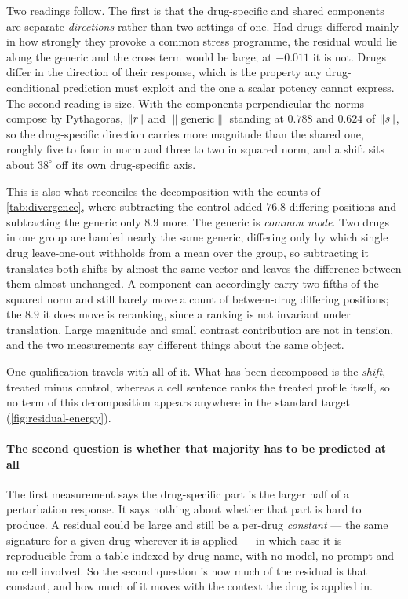Two readings follow. The first is that the drug-specific and shared components are
separate \emph{directions} rather than two settings of one. Had drugs differed
mainly in how strongly they provoke a common stress programme, the residual would
lie along the generic and the cross term would be large; at $-0.011$ it is not.
Drugs differ in the direction of their response, which is the property any
drug-conditional prediction must exploit and the one a scalar potency cannot
express. The second reading is size. With the components perpendicular the norms
compose by Pythagoras, $\lVert r \rVert$ and $\lVert \textrm{generic} \rVert$
standing at $0.788$ and $0.624$ of $\lVert s \rVert$, so the drug-specific direction carries more magnitude than the shared one, roughly five to four in norm and three to two in squared norm, and a
shift sits about $38^{\circ}$ off its own drug-specific axis.

This is also what reconciles the decomposition with the counts of
\cref{tab:divergence}, where subtracting the control added $76.8$ differing
positions and subtracting the generic only $8.9$ more. The generic is
\emph{common mode}. Two drugs in one group are handed nearly the same generic,
differing only by which single drug leave-one-out withholds from a mean over the
group, so subtracting it translates both shifts by almost the same vector and
leaves the difference between them almost unchanged. A component can accordingly
carry two fifths of the squared norm and still barely move a count of between-drug
differing positions; the $8.9$ it does move is reranking, since a ranking is not
invariant under translation. Large magnitude and small contrast contribution are
not in tension, and the two measurements say different things about the same
object.

One qualification travels with all of it. What has been decomposed is the
\emph{shift}, treated minus control, whereas a cell sentence ranks the treated
profile itself, so no term of this decomposition appears anywhere in the standard
target (\cref{fig:residual-energy}).




\paragraph{The second question is whether that majority has to be predicted at all}
The first measurement says the drug-specific part is the larger half of a
perturbation response. It says nothing about whether that part is hard to produce.
A residual could be large and still be a per-drug \emph{constant} --- the same
signature for a given drug wherever it is applied --- in which case it is
reproducible from a table indexed by drug name, with no model, no prompt and no
cell involved. So the second question is how much of the residual is that
constant, and how much of it moves with the context the drug is applied in.

